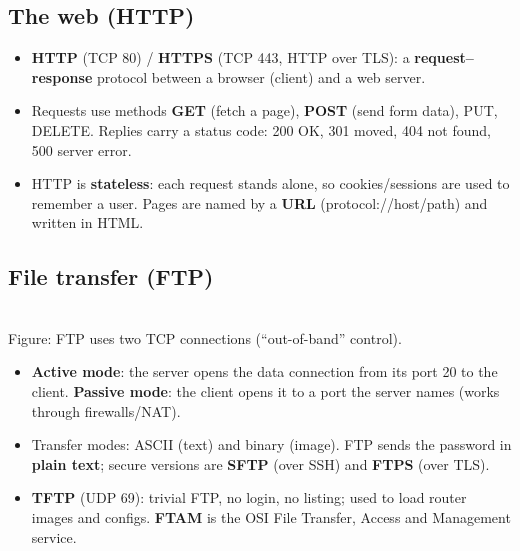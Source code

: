 \documentclass[10pt]{article}
\begin{document}
\subsection{The web (HTTP)}
\begin{itemize}
\item \textbf{HTTP} (TCP 80) / \textbf{HTTPS} (TCP 443, HTTP over TLS): a \textbf{request--response} protocol between a browser (client) and a web server.
\item Requests use methods \textbf{GET} (fetch a page), \textbf{POST} (send form data), PUT, DELETE. Replies carry a status code: 200 OK, 301 moved, 404 not found, 500 server error.
\item HTTP is \textbf{stateless}: each request stands alone, so cookies/sessions are used to remember a user. Pages are named by a \textbf{URL} (protocol://host/path) and written in HTML.
\end{itemize}

\subsection{File transfer (FTP)}
\begin{center}
\\
{\scriptsize\color{midgrey}Figure: FTP uses two TCP connections (``out-of-band'' control).}
\end{center}
\begin{itemize}
\item \textbf{Active mode}: the server opens the data connection from its port 20 to the client. \textbf{Passive mode}: the client opens it to a port the server names (works through firewalls/NAT).
\item Transfer modes: ASCII (text) and binary (image). FTP sends the password in \textbf{plain text}; secure versions are \textbf{SFTP} (over SSH) and \textbf{FTPS} (over TLS).
\item \textbf{TFTP} (UDP 69): trivial FTP, no login, no listing; used to load router images and configs. \textbf{FTAM} is the OSI File Transfer, Access and Management service.
\end{itemize}
\end{document}
